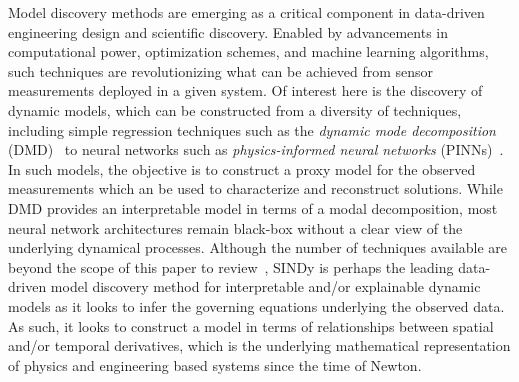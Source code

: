\documentclass{article}
\begin{document}

Model discovery methods are emerging as a critical component in data-driven engineering design and scientific discovery.
Enabled by advancements in computational power, optimization schemes, and machine learning algorithms, such techniques are revolutionizing what can be achieved from sensor measurements deployed in a given system.
Of interest here is the discovery of dynamic models, which can be constructed from a diversity of techniques, including simple regression techniques such as the {\em dynamic mode decomposition} (DMD)~\cite{kutz2016dynamic,ichinaga2024pydmd} to neural networks such as {\em physics-informed neural networks} (PINNs)~\cite{Raissi2019}.
In such models, the objective is to construct a proxy model for the observed measurements which an be used to characterize and reconstruct solutions.
While DMD provides an interpretable model in terms of a modal decomposition, most neural network architectures remain black-box without a clear view of the underlying dynamical processes.
Although the number of techniques available are beyond the scope of this paper to review~\cite{cuomo2022scientific}, SINDy is perhaps the leading data-driven model discovery method for interpretable and/or explainable dynamic models as it looks to infer the governing equations underlying the observed data.
As such, it looks to construct a model in terms of relationships between spatial and/or temporal derivatives, which is the underlying mathematical representation of physics and engineering based systems since the time of Newton.
\end{document}
